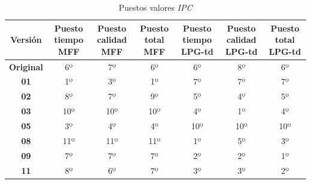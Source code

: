\documentclass{article}
\begin{document}
    
    \begin{landscape}
    \begin{table}[]
    \centering
    \caption{Puestos valores \textit{IPC}}
    \label{my-label}
    \begin{tabular}{|c|c|c|c|c|c|c|}
    \hline
    \textbf{Versión}   & \textbf{Puesto tiempo MFF} & \textbf{Puesto calidad MFF} & \textbf{Puesto total MFF\footnotemark[1]} & \textbf{Puesto tiempo LPG-td} & \textbf{Puesto calidad LPG-td} & \textbf{Puesto total LPG-td\footnotemark[1]} \\ \hline
    \textbf{Original}  & 6º                         & 7º                          & 6º                        & 6º                            & 8º                             & 6º                           \\ \hline
    \textbf{01}        & 1º                         & 3º                          & 1º                        & 7º                            & 7º                             & 7º                           \\ \hline
    \textbf{02}        & 8º                         & 7º                          & 9º                        & 5º                            & 4º                             & 5º                           \\ \hline
    \textbf{03}        & 10º                        & 10º                         & 10º                       & 4º                            & 1º                             & 4º                           \\ \hline
    \textbf{05}        & 3º                         & 4º                          & 4º                        & 10º                           & 10º                            & 10º                          \\ \hline
    \textbf{08}        & 11º                        & 11º                         & 11º                       & 1º                            & 5º                             & 3º                           \\ \hline
    \textbf{09}        & 7º                         & 7º                          & 7º                        & 2º                            & 2º                             & 1º                           \\ \hline
    \textbf{11}        & 8º                         & 6º                          & 7º                        & 3º                            & 3º                             & 2º                           \\ \hline

\end{tabular}
\end{table}
\end{landscape}
\end{document}
